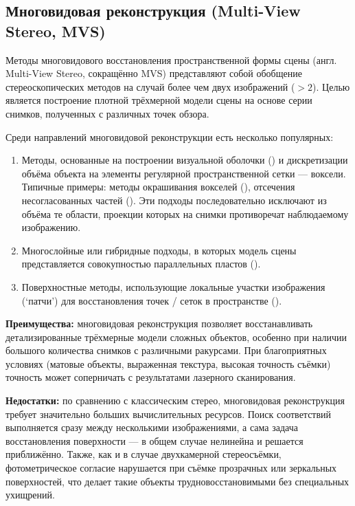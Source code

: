\subsection{Многовидовая реконструкция (Multi-View Stereo, MVS)}

Методы многовидового восстановления пространственной формы сцены (англ.
Multi-View Stereo, сокращённо MVS) представляют собой обобщение
стереоскопических методов на случай более чем двух изображений ($>2$). Целью
является построение плотной трёхмерной модели сцены на основе серии снимков,
полученных с различных точек обзора.

Среди направлений многовидовой реконструкции есть несколько популярных:

\begin{enumerate}
	\item Методы, основанные на построении визуальной оболочки (\cite{10.1109/34.273735})
	и дискретизации объёма объекта на элементы регулярной пространственной сетки —
	воксели. Типичные примеры: методы окрашивания вокселей (\cite{10.5555/794189.794361}),
	отсечения несогласованных частей (\cite{10.5555/898435}). Эти подходы последовательно
	исключают из объёма те области, проекции которых на снимки противоречат
	наблюдаемому изображению.

	\item Многослойные или гибридные подходы, в которых модель сцены
	представляется совокупностью параллельных пластов (\cite{10.1109/CVPR.1998.698642}).

	\item Поверхностные методы, использующие локальные участки изображения
	(`патчи') для восстановления точек /
	сеток в пространстве (\cite{10.1109/CVPR.2007.383246}).

\end{enumerate}

\textbf{Преимущества:} многовидовая реконструкция позволяет восстанавливать
детализированные трёхмерные модели сложных объектов, особенно при наличии
большого количества снимков с различными ракурсами. При благоприятных условиях
(матовые объекты, выраженная текстура, высокая точность съёмки) точность может
соперничать с результатами лазерного сканирования.

\textbf{Недостатки:} по сравнению с классическим стерео, многовидовая
реконструкция требует значительно больших вычислительных ресурсов. Поиск
соответствий выполняется сразу между несколькими изображениями, а сама задача
восстановления поверхности — в общем случае нелинейна и решается приближённо.
Также, как и в случае двухкамерной стереосъёмки, фотометрическое согласие
нарушается при съёмке прозрачных или зеркальных поверхностей, что делает такие
объекты трудновосстановимыми без специальных ухищрений.

